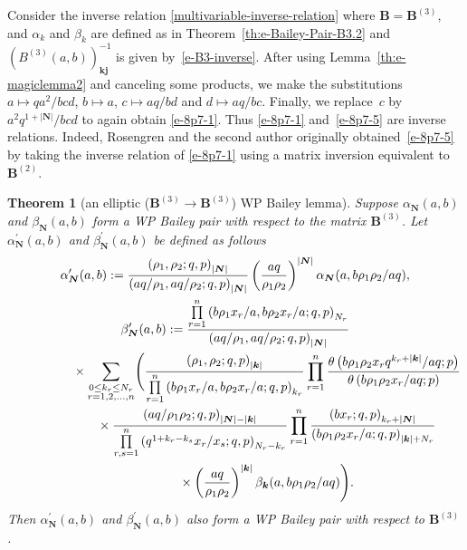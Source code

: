 \documentclass[pdftex]{sigma}
\numberwithin{equation}{section}
\newtheorem{Theorem}{Theorem}[section]
\newcommand{\sumN}{{\left| \boldsymbol{N} \right|}}
\newcommand\sumk{{\left| \boldsymbol{k} \right|}}
\newcommand{\B}{{ \mathbf B}}
\newcommand{\N}{{ \boldsymbol N}}
\renewcommand{\k}{{ \boldsymbol{k}}}
\renewcommand{\j}{{ \boldsymbol{j}}}
\newcommand{\multsum}[3]{{\sum\limits_{\substack{{0\le #1_#3 \le #2_#3} \\
{#3 =1,2,\dots, n}}}}}
\newcommand{\sqprod}[1]{\prod\limits_{r, s =1}^{#1}} %
\newcommand{\smallprod}[1]{\prod\limits_{r =1}^{#1}} %
\newcommand{\xover}[1]{#1_{r}/#1_{s}}
\newcommand{\ellipticqrfac}[2]{{\left({#1}; q, p\right)_{#2}}} %
\newcommand{\elliptictheta}[1]{\theta \left({#1} ; p\right) }
\begin{document}
Consider the inverse relation \eqref{multivariable-inverse-relation} where $\B=\B^{(3)}$, and $\alpha_k$ and $\beta_k$ are defined as in Theorem~\ref{th:e-Bailey-Pair-B3.2} and $(B^{(3)}(a,b))^{-1}_{\k\j} $ is given by~\eqref{e-B3-inverse}. After using Lemma~\ref{th:e-magiclemma2} and canceling some products, we make the substitutions $a\mapsto qa^2/bcd$, $b\mapsto a$, $c\mapsto aq/bd$ and $d\mapsto aq/bc$. Finally, we replace~$c$ by~$a^2q^{1+\sumN}/bcd$ to again obtain \eqref{e-8p7-1}. Thus \eqref{e-8p7-1} and~\eqref{e-8p7-5} are inverse relations. Indeed, Rosengren and the second author originally obtained~\eqref{e-8p7-5} by taking the inverse relation of \eqref{e-8p7-1} using a matrix inversion equivalent to $\B^{(2)}$.

\begin{Theorem}[an elliptic ($\B^{(3)}\to\B^{(3)}$) WP Bailey lemma] \label{th:e-WP-BaileyLemma-B3-B3}
Suppose $\alpha_\N(a,b)$ and $\beta_\N(a,b)$ form a WP Bailey pair with respect to the matrix $\B^{(3)}$. Let ${\alpha}^{\prime}_\N(a,b)$ and ${\beta}^{\prime}_\N(a,b)$ be defined as follows
\begin{gather*}
{\alpha}^{\prime}_\N(a,b) := \frac{\ellipticqrfac{\rho_1, \rho_2 }{\sumN}}
{\ellipticqrfac{aq/\rho_1, aq/\rho_2}{\sumN}}
\left(\frac{aq}{\rho_1\rho_2}\right)^{\sumN} \alpha_\N(a, b\rho_1\rho_2/aq),\\ %
{\beta}^{\prime}_\N (a,b) := \frac{ \smallprod n \ellipticqrfac{b\rho_1x_r/a, b\rho_2x_r/a}{N_r} }
{ \ellipticqrfac{aq/\rho_1, aq/\rho_2}{\sumN}} \notag \\
\hphantom{{\beta}^{\prime}_\N (a,b) :=}{}
\times \multsum{k}{N}{r} \Bigg(
\frac{ \ellipticqrfac{\rho_1, \rho_2}{\sumk} }
{\smallprod n \ellipticqrfac{b\rho_1x_r/a, b\rho_2x_r/a}{k_r}}
\smallprod n \frac{\elliptictheta{ b\rho_1\rho_2x_rq^{k_r+\sumk}/{aq}}}
{\elliptictheta{ b\rho_1\rho_2x_r/{aq}}}\\
\hphantom{{\beta}^{\prime}_\N (a,b) :=}{}\times \frac{\ellipticqrfac{aq/\rho_1\rho_2}{\sumN-\sumk}}
{\sqprod n \ellipticqrfac{q^{1+k_r-k_s}\xover x }{N_r-k_r}}
 \smallprod n \frac{\ellipticqrfac{bx_r}{k_r+\sumN}}{\ellipticqrfac{b\rho_1\rho_2x_r/a}{\sumk+N_r}} \notag \\
\hphantom{{\beta}^{\prime}_\N (a,b) :=}{}\times
\left(\frac{aq}{\rho_1\rho_2}\right)^{\sumk} \beta_\k(a,b\rho_1\rho_2/aq) \Bigg). %
\end{gather*}
Then ${\alpha}^{\prime}_\N(a,b)$ and ${\beta}^{\prime}_\N(a,b)$ also form a WP Bailey pair with respect to $\B^{(3)}$.
\end{Theorem}
\end{document}
